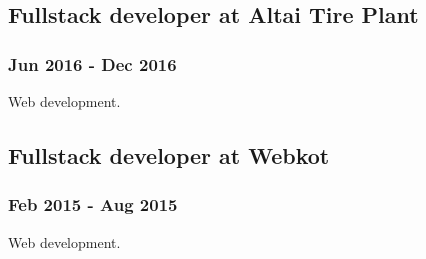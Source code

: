 \documentclass[letterpaper]{article}
\begin{document}
\subsection{Fullstack developer at Altai Tire Plant}
\label{sec:orgae94e67}
\subsubsection{Jun 2016 - Dec 2016}
\label{sec:orgf48e190}
Web development.

\subsection{Fullstack developer at Webkot}
\label{sec:orga843e6a}
\subsubsection{Feb 2015 - Aug 2015}
\label{sec:org1c6956c}
Web development.
\end{document}
